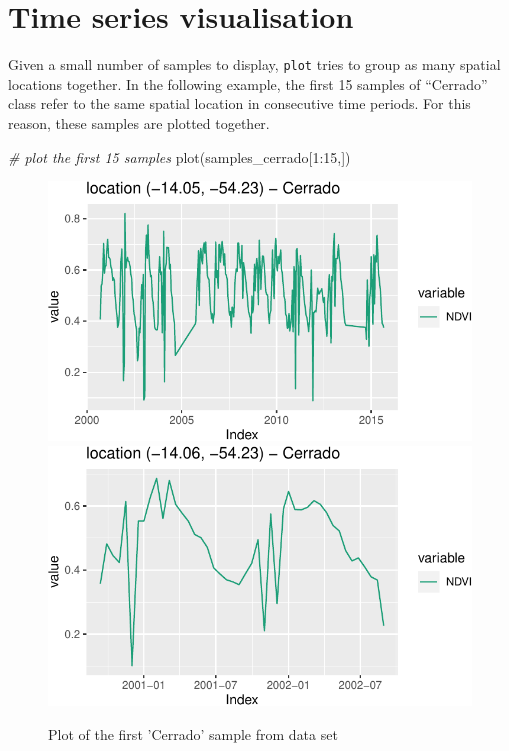 \documentclass[a4paper,]{tufte-book}
\newenvironment{Shaded}{}{}
\newcommand{\CommentTok}[1]{\textcolor[rgb]{0.38,0.63,0.69}{\textit{#1}}}
\newcommand{\DecValTok}[1]{\textcolor[rgb]{0.25,0.63,0.44}{#1}}
\newcommand{\FunctionTok}[1]{\textcolor[rgb]{0.02,0.16,0.49}{#1}}
\newcommand{\NormalTok}[1]{#1}
\newcommand{\SpecialCharTok}[1]{\textcolor[rgb]{0.25,0.44,0.63}{#1}}
\begin{document}
\hypertarget{time-series-visualisation}{%
\section{Time series visualisation}\label{time-series-visualisation}}

Given a small number of samples to display, \texttt{plot} tries to group as many spatial locations together. In the following example, the first 15 samples of ``Cerrado'' class refer to the same spatial location in consecutive time periods. For this reason, these samples are plotted together.

\begin{Shaded}
\begin{Highlighting}[]
\CommentTok{\# plot the first 15 samples}
\FunctionTok{plot}\NormalTok{(samples\_cerrado[}\DecValTok{1}\SpecialCharTok{:}\DecValTok{15}\NormalTok{,])}
\end{Highlighting}
\end{Shaded}

\begin{figure}

{\centering \includegraphics[width=0.7\linewidth]{sitsbook_files/figure-latex/cerrado-15-1} \includegraphics[width=0.7\linewidth]{sitsbook_files/figure-latex/cerrado-15-2} 

}

\caption[Plot of the first 'Cerrado' sample from data set]{Plot of the first 'Cerrado' sample from data set}\label{fig:cerrado-15}
\end{figure}
\end{document}
